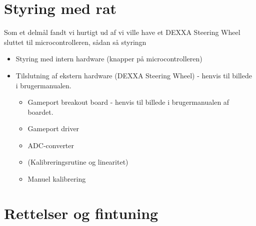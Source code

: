 \section{Styring med rat}
Som et delmål fandt vi hurtigt ud af vi ville have et DEXXA Steering Wheel sluttet til microcontrolleren, sådan så styringn

\begin{itemize}
\item Styring med intern hardware (knapper på microcontrolleren)
\item Tilslutning af ekstern hardware (DEXXA Steering Wheel) - henvis til billede i brugermanualen.
\begin{itemize}
\item Gameport breakout board - henvis til billede i brugermanualen af boardet.

\item Gameport driver

\item ADC-converter

\item (Kalibreringsrutine og linearitet)

\item Manuel kalibrering

\end{itemize}
\end{itemize}



\section{Rettelser og fintuning}

